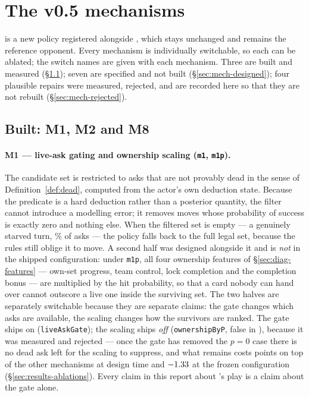 \section{The v0.5 mechanisms}
\label{sec:mechanisms}

\vfive{} is a new policy registered alongside \vfour{}, which stays unchanged and
remains the reference opponent. Every mechanism is individually switchable, so
each can be ablated; the switch names are given with each mechanism. Three are
built and measured (\S\ref{sec:mech-built}); seven are specified and not built
(\S\ref{sec:mech-designed}); four plausible repairs were measured, rejected, and
are recorded here so that they are not rebuilt (\S\ref{sec:mech-rejected}).

\subsection{Built: M1, M2 and M8}
\label{sec:mech-built}

\paragraph{M1 --- live-ask gating and ownership scaling (\texttt{m1}, \texttt{m1p}).}
The candidate set is restricted to asks that are not provably dead in the sense of
Definition~\ref{def:dead}, computed from the actor's own deduction state. Because
the predicate is a hard deduction rather than a posterior quantity, the filter
cannot introduce a modelling error; it removes moves whose probability of success
is exactly zero and nothing else. When the filtered set is empty --- a genuinely
starved turn, \numStarved\% of asks --- the policy falls back to the full legal
set, because the rules still oblige it to move. A second half was designed
alongside it and is \emph{not} in the shipped configuration: under \texttt{m1p},
all four ownership features of \S\ref{sec:diag-features} --- own-set progress,
team control, lock completion and the completion bonus --- are multiplied by the
hit probability, so that a card nobody can hand over cannot outscore a live one
inside the surviving set. The two halves are separately switchable because they
are separate claims: the gate changes which asks are available, the scaling
changes how the survivors are ranked. The gate ships on
(\texttt{liveAskGate}); the scaling ships \emph{off}
(\texttt{ownershipByP}, false in ), because it was
measured and rejected --- once the gate has removed the $p = 0$ case there is no
dead ask left for the scaling to suppress, and what remains costs
\numMonePReject{} points on top of the other mechanisms at design time and
$-1.33$ at the frozen configuration
(\S\ref{sec:results-ablations}). Every claim in this report about \vfive{}'s play
is a claim about the gate alone.

